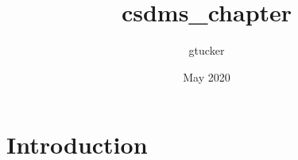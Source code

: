 \documentclass{article}
\title{csdms_chapter}
\author{gtucker }
\date{May 2020}
\begin{document}
\maketitle

\section{Introduction}
\end{document}
